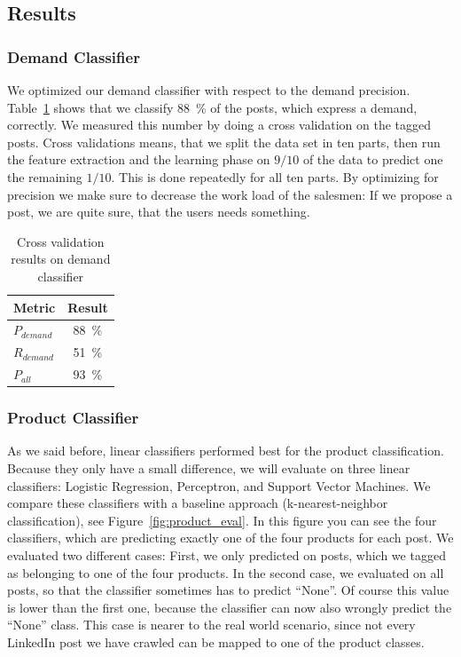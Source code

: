 \subsection{Results}
\label{sub:results}

\subsubsection{Demand Classifier}
\label{ssub:demand_classifier}

We optimized our demand classifier with respect to the demand precision.
Table~\ref{table:demand_evaluation} shows that we classify 88~\% of the posts, which express a demand, correctly.
We measured this number by doing a cross validation on the tagged posts.
Cross validations means, that we split the data set in ten parts, then run the feature extraction and the learning phase on $9 / 10$ of the data to predict one the remaining $1 / 10$.
This is done repeatedly for all ten parts.
By optimizing for precision we make sure to decrease the work load of the salesmen: If we propose a post, we are quite sure, that the users needs something.

\begin{table}[h]
	\centering
	\begin{tabular}{lc}
		\hline
		\textbf{Metric} & \textbf{Result}  \\
		\hline
		\hline
		$P_{demand}$ & 88~\% \\
		\hline
		$R_{demand}$ & 51~\%  \\
		\hline
		$P_{all}$ & 93~\%  \\
		\hline
	\end{tabular}
	\caption{Cross validation results on demand classifier}
	\label{table:demand_evaluation}
\end{table}

\subsubsection{Product Classifier}
\label{ssub:product_classifier}

As we said before, linear classifiers performed best for the product classification.
Because they only have a small difference, we will evaluate on three linear classifiers: Logistic Regression, Perceptron, and Support Vector Machines.
We compare these classifiers with a baseline approach (k-nearest-neighbor classification), see Figure~\ref{fig:product_eval}.
In this figure you can see the four classifiers, which are predicting exactly one of the four products for each post.
We evaluated two different cases:
First, we only predicted on posts, which we tagged as belonging to one of the four products.
In the second case, we evaluated on all posts, so that the classifier sometimes has to predict ``None''.
Of course this value is lower than the first one, because the classifier can now also wrongly predict the ``None'' class.
This case is nearer to the real world scenario, since not every LinkedIn post we have crawled can be mapped to one of the product classes.


